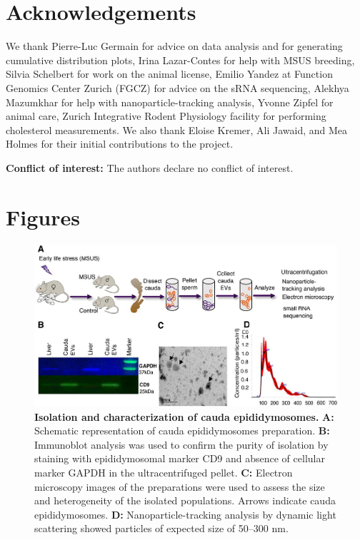 \documentclass[12pt,twoside]{reedthesis}
\begin{document}
\hypertarget{acknowledgements-1}{%
\section{Acknowledgements}\label{acknowledgements-1}}

We thank Pierre-Luc Germain for advice on data analysis and for
generating cumulative distribution plots, Irina Lazar-Contes for help
with MSUS breeding, Silvia Schelbert for work on the animal license,
Emilio Yandez at Function Genomics Center Zurich (FGCZ) for advice on
the sRNA sequencing, Alekhya Mazumkhar for help with
nanoparticle-tracking analysis, Yvonne Zipfel for animal care, Zurich
Integrative Rodent Physiology facility for performing cholesterol
measurements. We also thank Eloise Kremer, Ali Jawaid, and Mea Holmes
for their initial contributions to the project.

\textbf{Conflict of interest:} The authors declare no conflict of interest.

\newpage

\hypertarget{figures-2}{%
\section{Figures}\label{figures-2}}


\begin{figure}[htbp]

{\centering \includegraphics{thesis_files/figure-latex/ef1-1} 

}

\caption[Isolation and characterization of cauda epididymosomes]{\textbf{Isolation and characterization of cauda epididymosomes.} \newline \textbf{A:} Schematic representation of cauda epididymosomes preparation. \newline \textbf{B:} Immunoblot analysis was used to confirm the purity of isolation by staining with epididymosomal marker CD9 and absence of cellular marker GAPDH in the ultracentrifuged pellet. \newline \textbf{C:} Electron microscopy images of the preparations were used to assess the size and heterogeneity of the isolated populations. Arrows indicate cauda epididymosomes. \newline \textbf{D:} Nanoparticle-tracking analysis by dynamic light scattering showed particles of expected size of 50--300 nm.}\label{fig:ef1}
\end{figure}
\end{document}
